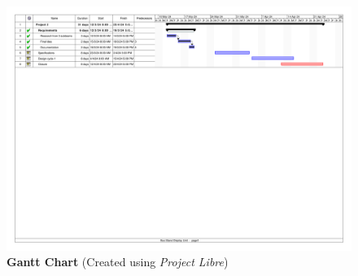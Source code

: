 \begin{landscapes}
    \newpage
    
    \begin{figure}[H]
        \centering
        \includegraphics[width=1.1\textwidth, trim={0cm 22.3cm 0cm 0.5cm}, clip]{./Files/Images/Gantt.pdf}
        \caption[\textbf{Gantt Chart}]{\textbf{Gantt Chart} {(Created using \textit{Project Libre})}}
    \end{figure}

\end{landscapes}

